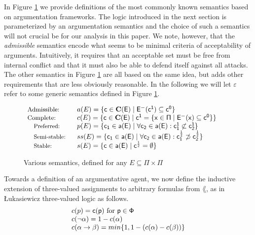 \documentclass[greybox]{svmult}
\newcommand{\proto}{\mathbf C}
\newcommand{\clab}{\sf c}
\newcommand{\sem}{\varepsilon}
\begin{document}
In Figure \ref{fig:sem} we provide definitions of the most commonly known semantics based on argumentation frameworks. The logic introduced in the next section is parameterized by an argumentation semantics and the choice of such a semantics will not crucial be for our analysis in this paper. We note, however, that the \emph{admissible} semantics encode what seems to be minimal criteria of acceptability of arguments. Intuitively, it requires that an acceptable set must be free from internal conflict and that it must also be able to defend itself against all attacks. The other semantics in Figure \ref{fig:sem} are all based on the same idea, but adds other requirements that are less obviously reasonable. In the following we will let $\sem$ refer to some generic semantics defined in Figure \ref{fig:sem}.

\begin{figure}
$\begin{array}{ll}
\text{\footnotesize{Admissible: }} & a(E) = \{\clab \in \proto(E) \mid  E^-(\clab^1) \subseteq \clab^0\} \\
\text{\footnotesize{Complete:}} & c(E) =  \{\clab \in \proto(E) \mid \clab^1 = \{x \in \Pi \mid E^-(x) \subseteq \clab^0\}\} \\
\text{\small{Preferred:}} \ \ & p(E) = \{\clab_1 \in a(E) \mid \forall \clab_2 \in a(E): \clab^1_1 \not \subset \clab^1_2\} \\
\text{\small{Semi-stable:}} \ \ & ss(E) = \{\clab_1 \in a(E) \mid \forall \clab_2 \in a(E): \clab^{\frac{1}{2}}_1 \not \supset \clab^{\frac{1}{2}}_2\} \\
\text{\small{Stable:}} \ \ & s(E) = \{\clab \in a(E) \mid \clab^{\frac{1}{2}} = \emptyset\} 
\end{array}$
\caption{Various semantics, defined for any $E \subseteq \Pi \times \Pi$}
\label{fig:sem}
\end{figure}

Towards a definition of an argumentative agent, we now define the inductive extension of three-valued assignments to arbitrary formulas from $\lang$, as in {\L}ukasiewicz three-valued logic as follows.
\begin{equation}\label{eq:lsem}
\begin{array}{l}
\overline \clab(p) = \clab(p) \text{ for } p \in \Phi \\
\overline \clab(\neg \alpha) = 1 - \overline \clab(\alpha) \\
\overline \clab(\alpha \to \beta) = min\{1,1-(\overline \clab(\alpha) - \overline \clab(\beta))\}
\end{array}
\end{equation}
\end{document}

